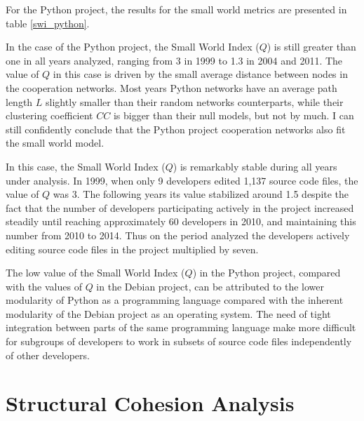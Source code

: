 For the Python project, the results for the small world metrics are presented in table \ref{swi_python}.



In the case of the Python project, the Small World Index ($Q$) is still greater than one in all years analyzed, ranging from 3 in 1999 to 1.3 in 2004 and 2011. The value of $Q$ in this case is driven by the small average distance between nodes in the cooperation networks. Most years Python networks have an average path length $L$ slightly smaller than their random networks counterparts, while their clustering coefficient $CC$ is bigger than their null models, but not by much. I can still confidently conclude that the Python project cooperation networks also fit the small world model.

In this case, the Small World Index ($Q$) is remarkably stable during all years under analysis. In 1999, when only 9 developers edited 1,137 source code files, the value of $Q$ was 3. The following years its value stabilized around 1.5 despite the fact that the number of developers participating actively in the project increased steadily until reaching approximately 60 developers in 2010, and maintaining this number from 2010 to 2014. Thus on the period analyzed the developers actively editing source code files in the project multiplied by seven.

The low value of the Small World Index ($Q$) in the Python project, compared with the values of $Q$ in the Debian project, can be attributed to the lower modularity of Python as a programming language compared with the inherent modularity of the Debian project as an operating system. The need of tight integration between parts of the same programming language make more difficult for subgroups of developers to work in subsets of source code files independently of other developers. 

\section{Structural Cohesion Analysis}

